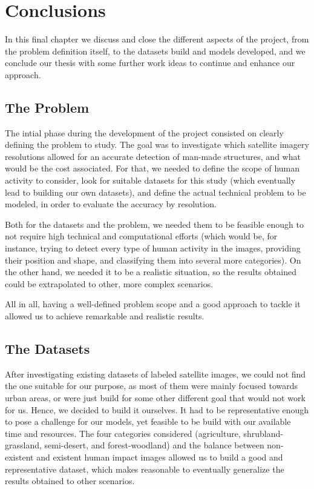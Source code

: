 
\chapter{Conclusions}

\label{Chapter6}


In this final chapter we discuss and close the different aspects of the project, from the problem definition itself, to the datasets build and models developed, and we conclude our thesis with some further work ideas to continue and enhance our approach.

\section{The Problem}

The intial phase during the development of the project consisted on clearly defining the problem to study. The goal was to investigate which satellite imagery resolutions allowed for an accurate detection of man-made structures, and what would be the cost associated. For that, we needed to define the scope of human activity to consider, look for suitable datasets for this study (which eventually lead to building our own datasets), and define the actual technical problem to be modeled, in order to evaluate the accuracy by resolution. 

Both for the datasets and the problem, we needed them to be feasible enough to not require high technical and computational efforts (which would be, for instance, trying to detect every type of human activity in the images, providing their position and shape, and classifying them into several more categories). On the other hand, we needed it to be a realistic situation, so the results obtained could be extrapolated to other, more complex scenarios.

All in all, having a well-defined problem scope and a good approach to tackle it allowed us to achieve remarkable and realistic results.

\section{The Datasets}

After investigating existing datasets of labeled satellite images, we could not find the one suitable for our purpose, as most of them were mainly focused towards urban areas, or were just build for some other different goal that would not work for us. Hence, we decided to build it ourselves. It had to be representative enough to pose a challenge for our models, yet feasible to be build with our available time and resources. The four categories considered (agriculture, shrubland-grassland, semi-desert, and forest-woodland) and the balance between non-existent and existent human impact images allowed us to build a good and representative dataset, which makes reasonable to eventually generalize the results obtained to other scenarios.

